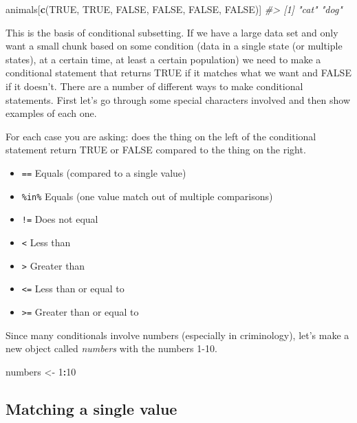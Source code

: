 \documentclass[
  12pt,
]{book}
\newenvironment{Shaded}{\begin{snugshade}}{\end{snugshade}}
\newcommand{\CommentTok}[1]{\textcolor[rgb]{0.37,0.37,0.37}{\textit{#1}}}
\newcommand{\DecValTok}[1]{\textcolor[rgb]{0.06,0.06,0.06}{#1}}
\newcommand{\KeywordTok}[1]{\textcolor[rgb]{0.27,0.27,0.27}{\textbf{#1}}}
\newcommand{\NormalTok}[1]{#1}
\newcommand{\OperatorTok}[1]{\textcolor[rgb]{0.43,0.43,0.43}{\textbf{#1}}}
\newcommand{\OtherTok}[1]{\textcolor[rgb]{0.37,0.37,0.37}{#1}}
\newcommand{\StringTok}[1]{\textcolor[rgb]{0.5,0.5,0.5}{#1}}
\providecommand{\tightlist}{%
  \setlength{\itemsep}{0pt}\setlength{\parskip}{0pt}}
\begin{document}
\begin{Shaded}
\begin{Highlighting}[]
\NormalTok{animals[}\KeywordTok{c}\NormalTok{(}\OtherTok{TRUE}\NormalTok{, }\OtherTok{TRUE}\NormalTok{, }\OtherTok{FALSE}\NormalTok{, }\OtherTok{FALSE}\NormalTok{, }\OtherTok{FALSE}\NormalTok{, }\OtherTok{FALSE}\NormalTok{)]}
\CommentTok{\#> [1] "cat" "dog"}
\end{Highlighting}
\end{Shaded}

This is the basis of conditional subsetting. If we have a large data set and only want a small chunk based on some condition (data in a single state (or multiple states), at a certain time, at least a certain population) we need to make a conditional statement that returns TRUE if it matches what we want and FALSE if it doesn't. There are a number of different ways to make conditional statements. First let's go through some special characters involved and then show examples of each one.

For each case you are asking: does the thing on the left of the conditional statement return TRUE or FALSE compared to the thing on the right.

\begin{itemize}
\tightlist
\item
  \texttt{==} Equals (compared to a single value)
\item
  \texttt{\%in\%} Equals (one value match out of multiple comparisons)
\item
  \texttt{!=} Does not equal
\item
  \texttt{\textless{}} Less than
\item
  \texttt{\textgreater{}} Greater than
\item
  \texttt{\textless{}=} Less than or equal to
\item
  \texttt{\textgreater{}=} Greater than or equal to
\end{itemize}

Since many conditionals involve numbers (especially in criminology), let's make a new object called \emph{numbers} with the numbers 1-10.

\begin{Shaded}
\begin{Highlighting}[]
\NormalTok{numbers <{-}}\StringTok{ }\DecValTok{1}\OperatorTok{:}\DecValTok{10}
\end{Highlighting}
\end{Shaded}

\hypertarget{matching-a-single-value}{%
\subsection{Matching a single value}\label{matching-a-single-value}}
\end{document}
